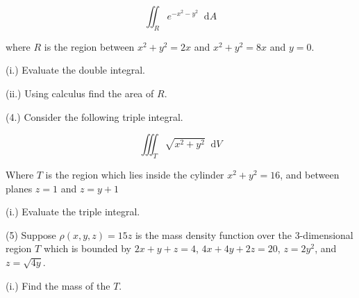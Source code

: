 \documentclass[11pt]{article}
\newcommand*\dif{\mathop{}\!\mathrm{d}}
\begin{document}
\begin{equation}
    \iint_R e^{-x^2-y^2} \dif{A}
\end{equation}



where $R$ is the region between $x^2+y^2 = 2x$ and $x^2+y^2 = 8x$ and $y=0$.

\vspace{.5cm}

(i.) Evaluate the double integral. 

\vspace{11cm}

(ii.) Using calculus find the area of $R$.


\newpage


(4.) Consider the following triple integral.

\begin{equation}
    \iiint_T \sqrt{x^2+y^2} \dif{V}
\end{equation}

Where $T$ is the region which lies inside the cylinder $x^2+y^2 =16$, and between planes $z=1$ and $z = y+1$


(i.) Evaluate the triple integral.


\newpage

(5) Suppose $\rho(x,y,z) = 15z$ is the mass density function over the 3-dimensional region $T$ which is bounded by $2x+y+z=4$, $4x+4y+2z=20$, $z=2y^2$, and $z=\sqrt{4y}$.

(i.) Find the mass of the $T$.
\end{document}
